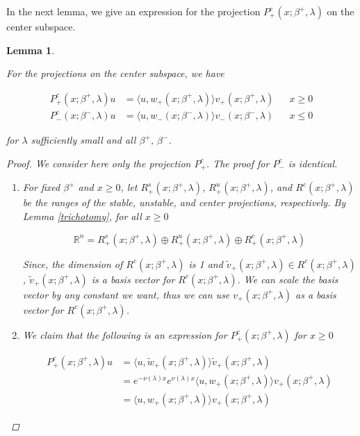 \documentclass[12pt]{article}
\def\R{{\mathbb R}}
\newtheorem{lemma}{Lemma}
\begin{document}

In the next lemma, we give an expression for the projection $P^c_+(x; \beta^+, \lambda)$ on the center subspace.

\begin{lemma}\label{centerproj}

For the projections on the center subspace, we have

\begin{align}\label{Pc}
P^c_+(x; \beta^+, \lambda)u &= \langle u, w_+(x; \beta^+, \lambda) \rangle v_+(x; \beta^+, \lambda) && x \geq 0 \\
P^c_-(x; \beta^-, \lambda)u &= \langle u, w_-(x; \beta^-, \lambda) \rangle v_-(x; \beta^-, \lambda) && x \leq 0
\end{align}

for $\lambda$ sufficiently small and all $\beta^+$, $\beta^-$.

\begin{proof}

We consider here only the projection $P^c_+$. The proof for $P^c_-$ is identical.

\begin{enumerate}

\item For fixed $\beta^+$ and $x \geq 0$, let $R^s_+(x; \beta^+, \lambda)$, $R^u_+(x; \beta^+, \lambda)$, and $R^c(x; \beta^+, \lambda)$ be the ranges of the stable, unstable, and center projections, respectively. By Lemma \ref{trichotomy}, for all $x \geq 0$

\[
\R^n = R^s_+(x; \beta^+, \lambda) \oplus R^u_+(x; \beta^+, \lambda) \oplus R^c_+(x; \beta^+, \lambda)
\]

Since, the dimension of $R^c(x; \beta^+, \lambda)$ is 1 and $\tilde{v}_+(x; \beta^+, \lambda) \in R^c(x; \beta^+, \lambda)$, $\tilde{v}_+(x; \beta^+, \lambda)$ is a basis vector for $R^c(x; \beta^+, \lambda)$. We can scale the basis vector by any constant we want, thus we can use $v_+(x; \beta^+, \lambda)$ as a basis vector for $R^c(x; \beta^+, \lambda)$.

\item We claim that the following is an expression for $P^c_+(x; \beta^+, \lambda)$ for $x \geq 0$

\begin{align*}
P^c_+(x; \beta^+, \lambda)u &= \langle u, \tilde{w}_+(x; \beta^+, \lambda) \rangle \tilde{v}_+(x; \beta^+, \lambda) \\
&= e^{-\nu(\lambda)x} e^{\nu(\lambda) x }\langle u, w_+(x; \beta^+, \lambda) \rangle v_+(x; \beta^+, \lambda) \\
&= \langle u, w_+(x; \beta^+, \lambda) \rangle v_+(x; \beta^+, \lambda)
\end{align*}


\end{enumerate}
\end{proof}
\end{lemma}
\end{document}
